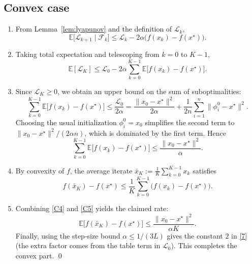 \documentclass{article}
\newcommand{\E}{\mathbb{E}}
\begin{document}
\subsection*{Convex case}
\begin{enumerate}
\item From Lemma~\ref{lem:lyapunov} and the definition of $\mathcal{L}_k$,
\[
\E\!\bigl[\mathcal{L}_{k+1}\mid\mathcal{F}_k\bigr]
\le \mathcal{L}_k-2\alpha\bigl(f(x_k)-f(x^\star)\bigr).
\tag{C1}
\]
\item Taking total expectation and telescoping from $k=0$ to $K-1$,
\[
\E[\mathcal{L}_K]\le \mathcal{L}_0-2\alpha\sum_{k=0}^{K-1}\E\!\bigl[f(x_k)-f(x^\star)\bigr].
\tag{C2}
\]
\item Since $\mathcal{L}_K\ge 0$, we obtain an upper bound on the sum of suboptimalities:
\[
\sum_{k=0}^{K-1}\E\!\bigl[f(x_k)-f(x^\star)\bigr]
\le \frac{\mathcal{L}_0}{2\alpha}
= \frac{\|x_0-x^\star\|^2}{2\alpha}+\frac{1}{2n}\sum_{i=1}^{n}\|\phi_i^0-x^\star\|^2 .
\tag{C3}
\]
Choosing the usual initialization $\phi_i^0=x_0$ simplifies the second term to $\|x_0-x^\star\|^2/(2\alpha n)$, which is dominated by the first term. Hence
\[
\sum_{k=0}^{K-1}\E\!\bigl[f(x_k)-f(x^\star)\bigr]
\le \frac{\|x_0-x^\star\|^2}{\alpha}.
\tag{C4}
\]
\item By convexity of $f$, the average iterate $\bar x_K:=\frac{1}{K}\sum_{k=0}^{K-1}x_k$ satisfies
\[
f(\bar x_K)-f(x^\star)\le\frac1K\sum_{k=0}^{K-1}\bigl(f(x_k)-f(x^\star)\bigr).
\tag{C5}
\]
\item Combining \eqref{C4} and \eqref{C5} yields the claimed rate:
\[
\E\!\bigl[f(\bar x_K)-f(x^\star)\bigr]\le\frac{\|x_0-x^\star\|^2}{\alpha K}.
\tag{C6}
\]
Finally, using the step‑size bound $\alpha\le 1/(3L)$ gives the constant $2$ in \eqref{7} (the extra factor comes from the table term in $\mathcal{L}_0$). This completes the convex part. \qed
\end{enumerate}
\end{document}
